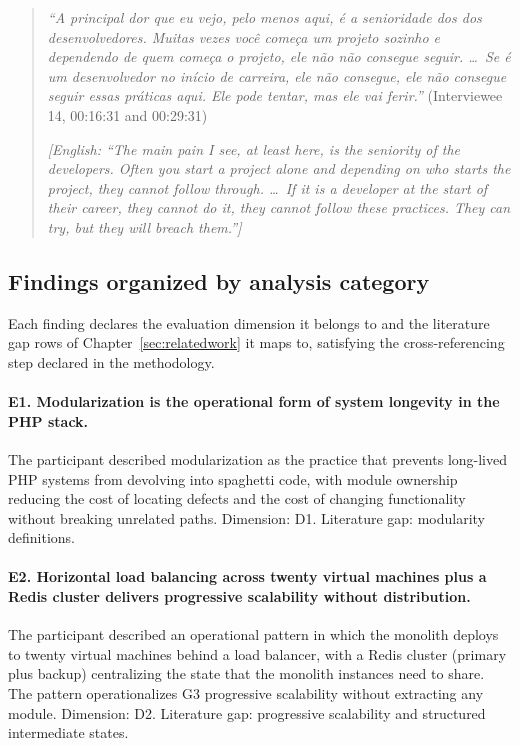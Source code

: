 \begin{quote}
\emph{``A principal dor que eu vejo, pelo menos aqui, \'e a senioridade dos dos desenvolvedores. Muitas vezes voc\^e come\c{c}a um projeto sozinho e dependendo de quem come\c{c}a o projeto, ele n\~ao n\~ao consegue seguir. \ldots\ Se \'e um desenvolvedor no in\'icio de carreira, ele n\~ao consegue, ele n\~ao consegue seguir essas pr\'aticas aqui. Ele pode tentar, mas ele vai ferir.''} (Interviewee 14, 00:16:31 and 00:29:31)

\emph{[English: ``The main pain I see, at least here, is the seniority of the developers. Often you start a project alone and depending on who starts the project, they cannot follow through. \ldots\ If it is a developer at the start of their career, they cannot do it, they cannot follow these practices. They can try, but they will breach them.'']}
\end{quote}

\subsection*{Findings organized by analysis category}

Each finding declares the evaluation dimension it belongs to and the literature gap rows of Chapter~\ref{sec:relatedwork} it maps to, satisfying the cross-referencing step declared in the methodology.

\paragraph*{E1. Modularization is the operational form of system longevity in the PHP stack.} The participant described modularization as the practice that prevents long-lived PHP systems from devolving into spaghetti code, with module ownership reducing the cost of locating defects and the cost of changing functionality without breaking unrelated paths. Dimension: D1. Literature gap: modularity definitions.

\paragraph*{E2. Horizontal load balancing across twenty virtual machines plus a Redis cluster delivers progressive scalability without distribution.} The participant described an operational pattern in which the monolith deploys to twenty virtual machines behind a load balancer, with a Redis cluster (primary plus backup) centralizing the state that the monolith instances need to share. The pattern operationalizes G3 progressive scalability without extracting any module. Dimension: D2. Literature gap: progressive scalability and structured intermediate states.

